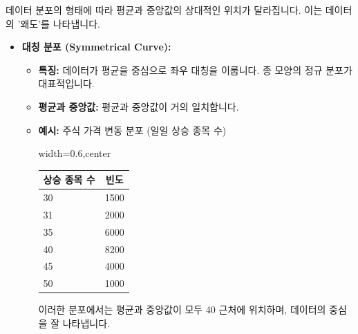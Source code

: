 \documentclass[11pt,a4paper]{article}
\begin{document}
\begin{tcolorbox}[mybox={평균과 중앙값의 관계: 분포의 왜도 (Skewness)}]
데이터 분포의 형태에 따라 평균과 중앙값의 상대적인 위치가 달라집니다. 이는 데이터의 '왜도'를 나타냅니다.

\begin{itemize}
    \item \textbf{대칭 분포 (Symmetrical Curve):}
    \begin{itemize}
        \item \textbf{특징:} 데이터가 평균을 중심으로 좌우 대칭을 이룹니다. 종 모양의 정규 분포가 대표적입니다.
        \item \textbf{평균과 중앙값:} 평균과 중앙값이 거의 일치합니다.
        \item \textbf{예시:} 주식 가격 변동 분포 (일일 상승 종목 수)
        \begin{adjustbox}{width=0.6\textwidth,center}
        \begin{tabular}{lc}
        \toprule
        \textbf{상승 종목 수} & \textbf{빈도} \\
        \midrule
        30 & 1500 \\
        31 & 2000 \\
        35 & 6000 \\
        40 & 8200 \\
        45 & 4000 \\
        50 & 1000 \\
        \bottomrule
        \end{tabular}
        \end{adjustbox}
        \label{tab:symmetrical_curve}
        이러한 분포에서는 평균과 중앙값이 모두 40 근처에 위치하며, 데이터의 중심을 잘 나타냅니다.
    \end{itemize}


\end{itemize}
\end{tcolorbox}
\end{document}

